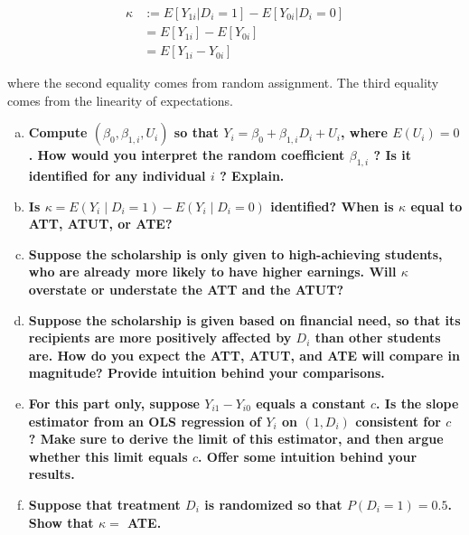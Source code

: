 \documentclass{article}
\begin{document}
\begin{align*}
\kappa & :=E\left[Y_{1i}|D_{i}=1\right]-E\left[Y_{0i}|D_{i}=0\right]\\
 & =E\left[Y_{1i}\right]-E\left[Y_{0i}\right]\\
 & =E\left[Y_{1i}-Y_{0i}\right]
\end{align*}

where the second equality comes from random assignment. The third
equality comes from the linearity of expectations. 




\begin{enumerate}[(a), wide, labelwidth=!, labelindent=0pt]
    \item \textbf{Compute $\left(\beta_{0}, \beta_{1, i}, U_{i}\right)$ so that $Y_{i}=\beta_{0}+\beta_{1, i} D_{i}+U_{i}$, where $E\left(U_{i}\right)=0$. How would you interpret the random coefficient $\beta_{1, i}$ ? Is it identified for any individual $i$ ? Explain.}
    
    \item \textbf{Is $\kappa=E\left(Y_{i} \mid D_{i}=1\right)-E\left(Y_{i} \mid D_{i}=0\right)$ identified? When is $\kappa$ equal to ATT, ATUT, or ATE?}
    
    \item \textbf{Suppose the scholarship is only given to high-achieving students, who are already more likely to have higher earnings. Will $\kappa$ overstate or understate the ATT and the ATUT?}
    
    \item \textbf{Suppose the scholarship is given based on financial need, so that its recipients are more positively affected by $D_{i}$ than other students are. How do you expect the ATT, ATUT, and ATE will compare in magnitude? Provide intuition behind your comparisons.}
    
    \item \textbf{For this part only, suppose $Y_{i 1}-Y_{i 0}$ equals a constant $c$. Is the slope estimator from an OLS regression of $Y_{i}$ on $\left(1, D_{i}\right)$ consistent for $c$ ? Make sure to derive the limit of this estimator, and then argue whether this limit equals $c$. Offer some intuition behind your results.}
    
    \item \textbf{Suppose that treatment $D_{i}$ is randomized so that $P\left(D_{i}=1\right)=0.5$. Show that $\kappa=$ ATE.}    
    
\end{enumerate}
\end{document}
